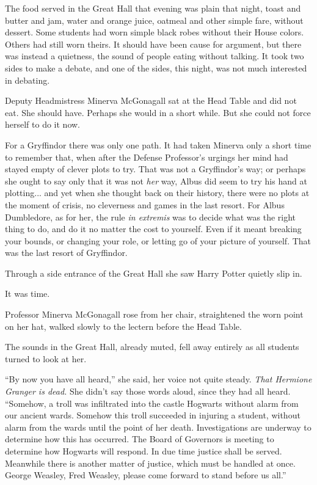 The food served in the Great Hall that evening was plain that night, toast and butter and jam, water and orange juice, oatmeal and other simple fare, without dessert. Some students had worn simple black robes without their House colors. Others had still worn theirs. It should have been cause for argument, but there was instead a quietness, the sound of people eating without talking. It took two sides to make a debate, and one of the sides, this night, was not much interested in debating.

Deputy Headmistress Minerva McGonagall sat at the Head Table and did not eat. She should have. Perhaps she would in a short while. But she could not force herself to do it now.

For a Gryffindor there was only one path. It had taken Minerva only a short time to remember that, when after the Defense Professor's urgings her mind had stayed empty of clever plots to try. That was not a Gryffindor's way; or perhaps she ought to say only that it was not \emph{her} way, Albus did seem to try his hand at plotting... and yet when she thought back on their history, there were no plots at the moment of crisis, no cleverness and games in the last resort. For Albus Dumbledore, as for her, the rule \emph{in extremis} was to decide what was the right thing to do, and do it no matter the cost to yourself. Even if it meant breaking your bounds, or changing your role, or letting go of your picture of yourself. That was the last resort of Gryffindor.

Through a side entrance of the Great Hall she saw Harry Potter quietly slip in.

It was time.

Professor Minerva McGonagall rose from her chair, straightened the worn point on her hat, walked slowly to the lectern before the Head Table.

The sounds in the Great Hall, already muted, fell away entirely as all students turned to look at her.

``By now you have all heard,'' she said, her voice not quite steady. \emph{That Hermione Granger is dead.} She didn't say those words aloud, since they had all heard. ``Somehow, a troll was infiltrated into the castle Hogwarts without alarm from our ancient wards. Somehow this troll succeeded in injuring a student, without alarm from the wards until the point of her death. Investigations are underway to determine how this has occurred. The Board of Governors is meeting to determine how Hogwarts will respond. In due time justice shall be served. Meanwhile there is another matter of justice, which must be handled at once. George Weasley, Fred Weasley, please come forward to stand before us all.''

